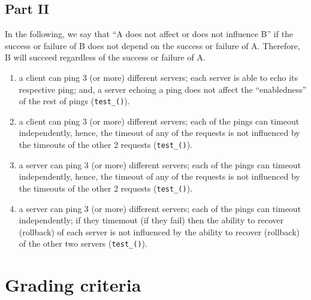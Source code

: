 \documentclass{article} %
\begin{document}
\subsection*{Part II}

In the following, we say that ``A does not affect or does not influence B'' if the success or failure of B does not depend on the success or failure of A. Therefore, B will succeed regardless of the success or failure of A.

\begin{enumerate}[leftmargin=*, label=(\textbf{\arabic*})]
\item a client can ping 3 (or more) different servers; each server is able to echo its respective ping; and, a server echoing a ping does not affect the ``enabledness'' of the rest of pings (\texttt{test\_()}). 
\item a client can ping 3 (or more) different servers; each of the pings can timeout independently, hence, the timeout of any of the requests is not influenced by the timeouts of the other 2 requests (\texttt{test\_()}). 
\item a server can ping 3 (or more) different servers; each of the pings can timeout independently, hence, the timeout of any of the requests is not influenced by the timeouts of the other 2 requests (\texttt{test\_()}). 
\item a server can ping 3 (or more) different servers; each of the pings can timeout independently; if they timemout (if they fail) then the ability to recover (rollback) of each server is not influenced by the ability to recover (rollback) of the other two servers (\texttt{test\_()}). 
\end{enumerate}


\section{Grading criteria}
\end{document}
